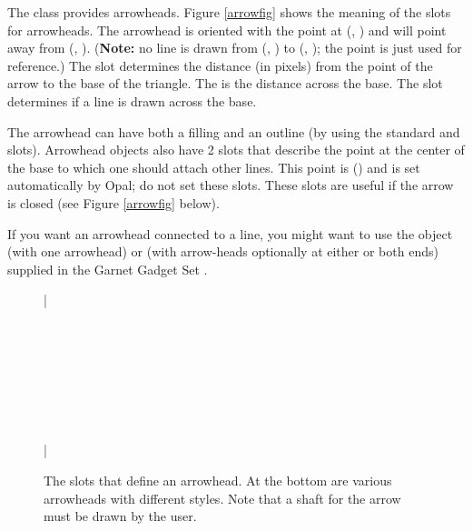     
   
The  class provides arrowheads.  Figure \ref{arrowfig}
shows the meaning of the slots for arrowheads. The arrowhead is
oriented with the point at (, ) and will point away
from (, ).  ({\bf Note:} no line is
drawn from (, ) to (, ); the
 point is just used for reference.)  The  slot
determines the distance (in pixels) from the point of the arrow to the base
of the triangle.  The  is the distance across the base.  The
 slot determines if a line is drawn across the base.

The arrowhead can have both a filling and an outline (by using the standard
 and  slots).  Arrowhead objects
also have 2 slots that describe the point at the center of the base to
which one should attach other lines.  This point is () and is set automatically by Opal; do not set these slots.
These slots are useful if the arrow is closed (see Figure
\ref{arrowfig} below).

If you want an arrowhead connected to a line, you might want to use the
 object (with one arrowhead) or  (with
arrow-heads optionally at either or both ends) supplied in the Garnet
Gadget Set \cite{GarnetGadgetsManual}.

\begin{figure}
\bar{}
\begin{center}
\end{center}
\begin{tabular}
\tabset{2in, 2.5in, 3in, 3.5in, 4in}\\
\\
\\
\\
\Tabclear\\
\vspace{1 line}\\
\end{tabular}
\caption{The slots that define an arrowhead. At the bottom are various
arrowheads with different styles.  Note that a shaft for the arrow must be
drawn by the user.}
\bar{}
\end{figure}



